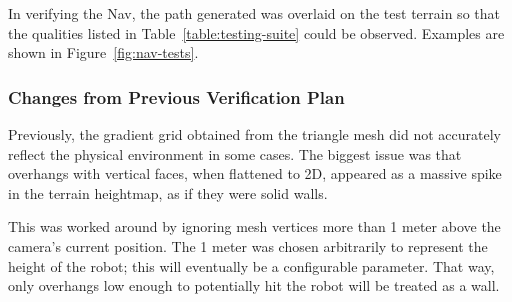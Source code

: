 In verifying the Nav, the path generated was overlaid on the test terrain so that the qualities listed in
Table~\ref{table:testing-suite} could be observed. Examples are shown in Figure~\ref{fig:nav-tests}.

\subsubsection{Changes from Previous Verification Plan}\label{subsubsec:changes-to-plan}
Previously, the gradient grid obtained from the triangle mesh did not accurately reflect the physical environment in
some cases.
The biggest issue was that overhangs with vertical faces, when flattened to 2D, appeared as a massive spike in the
terrain heightmap, as if they were solid walls.

This was worked around by ignoring mesh vertices more than 1 meter above the camera's current position.
The 1 meter was chosen arbitrarily to represent the height of the robot; this will eventually be a configurable
parameter.
That way, only overhangs low enough to potentially hit the robot will be treated as a wall.
